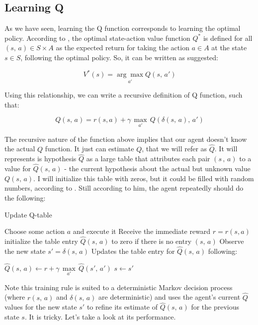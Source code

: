 \documentclass[a4paper]{article}
\begin{document}
\subsection{Learning Q}
As we have seen, learning the Q function corresponds to learning the optimal policy. According to \cite{Mohri_2012}, the optimal state-action value function $Q^{*}$ is defined for all $(s, \, a) \in S \times A$ as the expected return for taking the action $a \in A$ at the state $s \in S$, following the optimal policy. So, it can be written as \cite{Mitchell} suggested:

$$V^{*}(s) = \underset{a'}{\arg \max} Q(s, \, a')$$

Using this relationship, we can write a recursive definition of Q function, such that:

$$Q(s, \, a) = r(s, a) + \gamma \, \underset{a'}{\max} \, Q(\delta(s,\, a), \, a')$$

The recursive nature of the function above implies that our agent doesn't know the actual $Q$ function. It just can estimate $Q$, that we will refer as $\hat{Q}$. It will represents is hypothesis $\hat{Q}$ as a large table that attributes each pair $(s\, , \, a)$ to a value for $\hat{Q}(s,\, a)$ - the current hypothesis about the actual but unknown value $Q(s, \, a)$. I will initialize this table with zeros, but it could be filled with random numbers, according to \cite{Mitchell}. Still according to him, the agent repeatedly should do the following:

\begin{algorithm}
\caption{Update Q-table}\label{alg:qtable}
\begin{algorithmic}[1]
  \State Choose some action $a$ and execute it
  \State Receive the immediate reward $r = r(s, a)$
  \State initialize the table entry $\hat{Q}(s, \, a)$ to zero if there is no entry $(s, \, a)$
  \State Observe the new state $s' = \delta(s, \,a)$
  \State Updates the table entry for $\hat{Q}(s, \, a)$ following:

    \do $\hat{Q}(s, \, a) \leftarrow r + \gamma \, \underset{a'}{\max}\, \hat{Q}(s', \, a')$
  \State $s \leftarrow s'$
\EndLoop
\end{algorithmic}
\end{algorithm}

Note this training rule is suited to a deterministic Markov decision process (where $r(s,\, a)$ and $\delta(s,\, a)$ are deterministic) and uses the agent's current $\hat{Q}$ values for the new state $s'$ to refine its estimate of $\hat{Q}(s, \,a)$ for the previous state $s$. It is tricky. Let's take a look at its performance.
\end{document}
